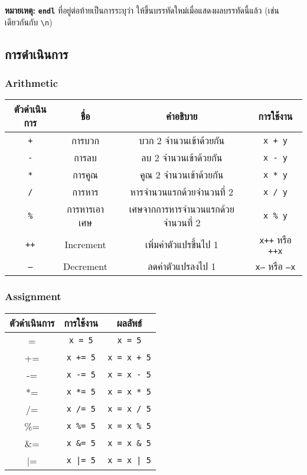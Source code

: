 \noindent\textbf{หมายเหตุ:} \textbf{\texttt{endl}} ที่อยู่ต่อท้ายเป็นการระบุว่า ให้ขึ้นบรรทัดใหม่เมื่อแสดงผลบรรทัดนี้แล้ว (เช่นเดียวกันกับ \texttt{\textbackslash n})

\newpage
\subsection{การดำเนินการ}
\subsubsection{Arithmetic}
\begin{center}
\begin{tabular}{||c|c|c|c||}
\hline
\textbf{ตัวดำเนินการ} & \textbf{ชื่อ} & \textbf{คำอธิบาย} & \textbf{การใช้งาน} \\
\hline
\texttt{+} & การบวก & บวก 2 จำนวนเข้าด้วยกัน & \texttt{x + y} \\
\texttt{-} & การลบ & ลบ 2 จำนวนเข้าด้วยกัน & \texttt{x - y} \\
\texttt{*} & การคูณ & คูณ 2 จำนวนเข้าด้วยกัน & \texttt{x * y} \\
\texttt{/} & การหาร & หารจำนวนแรกด้วยจำนวนที่ 2 & \texttt{x / y} \\
\texttt{\%} & การหารเอาเศษ & เศษจากการหารจำนวนแรกด้วยจำนวนที่ 2 & \texttt{x \% y} \\
\texttt{++} & Increment & เพิ่มค่าตัวแปรขึ้นไป 1 & \texttt{x++} หรือ \texttt{++x} \\
\texttt{--} & Decrement & ลดค่าตัวแปรลงไป 1 & \texttt{x--} หรือ \texttt{--x} \\
\hline
\end{tabular}
\end{center}
\subsubsection{Assignment}
\begin{center}
\begin{tabular}{||c|c|c||}
\hline
\textbf{ตัวดำเนินการ} & \textbf{การใช้งาน} & \textbf{ผลลัพธ์} \\
\hline
= & \texttt{x = 5} & \texttt{x = 5} \\
+= & \texttt{x += 5} & \texttt{x = x + 5} \\
-= & \texttt{x -= 5} & \texttt{x = x - 5} \\
*= & \texttt{x *= 5} & \texttt{x = x * 5} \\
/= & \texttt{x /= 5} & \texttt{x = x / 5} \\
\%= & \texttt{x \%= 5} & \texttt{x = x \% 5} \\
\&= & \texttt{x \&= 5} & \texttt{x = x \& 5} \\
|= & \texttt{x |= 5} & \texttt{x = x | 5} \\
\hline
\end{tabular}
\end{center}
